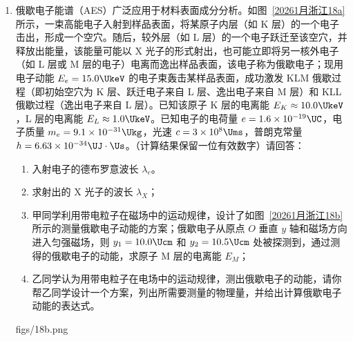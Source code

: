 \documentclass[\gkver]{gaokaozhenti}
\begin{document}
\begin{enumerate}
\item
俄歇电子能谱（AES）广泛应用于材料表面成分分析。如图~\ref{20261月浙江18a} 所示，一束高能电子入射到样品表面，将某原子内层（如 K 层）的一个电子击出，形成一个空穴。随后，较外层（如 L 层）的一个电子跃迁至该空穴，并释放出能量，该能量可能以 X 光子的形式射出，也可能立即将另一核外电子（如 L 层或 M 层的电子）电离而逸出样品表面，该电子称为俄歇电子；现用电子动能 $E_{e} = 15.0\UkeV$ 的电子束轰击某样品表面，成功激发 KLM 俄歇过程（即初始空穴为 K 层、跃迁电子来自 L 层、逸出电子来自 M 层）和 KLL 俄歇过程（逸出电子来自 L 层）。已知该原子 K 层的电离能 $E_{K} \approx 10.0\UkeV$，L 层的电离能 $E_{L} \approx 1.0\UkeV$。已知电子的电荷量 $e = 1.6\times10^{-19}\UC$，电子质量 $m_{e} = 9.1\times10^{-31}\Ukg$，光速 $c = 3\times10^{8}\Ums$，普朗克常量 $h = 6.63\times10^{-34}\UJ\cdot\Us$。（计算结果保留一位有效数字）请回答：
\begin{enumerate}
	\item
	入射电子的德布罗意波长 $\lambda_{e}$。
	\item
	求射出的 X 光子的波长 $\lambda_{X}$；
	\item
	甲同学利用带电粒子在磁场中的运动规律，设计了如图~\ref{20261月浙江18b} 所示的测量俄歇电子动能的方案；俄歇电子从原点 $O$ 垂直 $y$ 轴和磁场方向进入匀强磁场，则 $y_{1} = 10.0\Ucm$ 和 $y_{2} = 10.5\Ucm$ 处被探测到，通过测得的俄歇电子的动能，求原子 M 层的电离能 $E_{M}$；
	\item
	乙同学认为用带电粒子在电场中的运动规律，测出俄歇电子的动能，请你帮乙同学设计一个方案，列出所需要测量的物理量，并给出计算俄歇电子动能的表达式。
\end{enumerate}
{figs/18b.png}
\end{enumerate}
\end{document}
